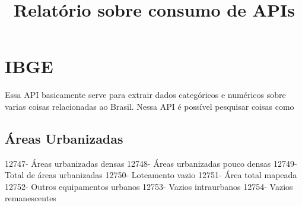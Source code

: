 \documentclass[12pt,a4paper]{article}
\title{\textbf{Relatório sobre consumo de APIs}}
\author{}
\date{}
\begin{document}
\maketitle

\section{IBGE}

Essa API basicamente serve para extrair dados categóricos e numéricos sobre varias coisas relacionadas ao Brasil. Nessa API é possível pesquisar coisas como

\subsection{Áreas Urbanizadas}
12747- Áreas urbanizadas densas
12748- Áreas urbanizadas pouco densas
12749- Total de áreas urbanizadas
12750- Loteamento vazio
12751- Área total mapeada
12752- Outros equipamentos urbanos
12753- Vazios intraurbanos
12754- Vazios remanescentes
\end{document}

